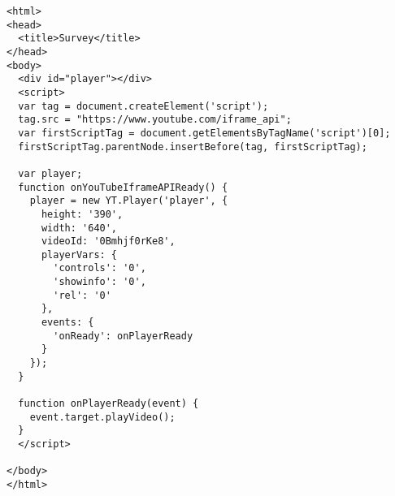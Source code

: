 \begin{frame}[fragile]
\tiny
\begin{verbatim}
<html>
<head>
  <title>Survey</title>
</head>
<body>
  <div id="player"></div>
  <script>
  var tag = document.createElement('script'); 
  tag.src = "https://www.youtube.com/iframe_api";
  var firstScriptTag = document.getElementsByTagName('script')[0];
  firstScriptTag.parentNode.insertBefore(tag, firstScriptTag);
  
  var player;
  function onYouTubeIframeAPIReady() {
    player = new YT.Player('player', {
      height: '390',
      width: '640',
      videoId: '0Bmhjf0rKe8',
      playerVars: {
        'controls': '0',
        'showinfo': '0',
        'rel': '0'
      },
      events: {
        'onReady': onPlayerReady
      }
    });
  }
  
  function onPlayerReady(event) {
    event.target.playVideo();
  }
  </script>
  
</body>
</html>
\end{verbatim}
\end{frame}










